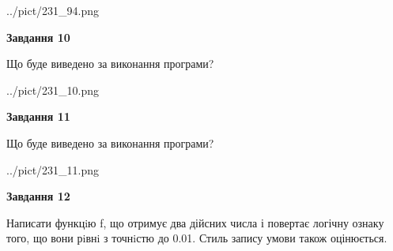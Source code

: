 \documentclass[12pt, ukrainian]{article}
\begin{document}
{\begin {large}
\begin{center}
	{../pict/231_94.png}
\end{center}
\newpage

{\begin {center}\textbf{Завдання 10}\end {center}}

Що буде виведено за виконання програми?\par
\begin{center}
	{../pict/231_10.png}
\end{center}
\newpage

{\begin {center}\textbf{Завдання 11}\end {center}}

Що буде виведено за виконання програми?\par
\begin{center}
	{../pict/231_11.png}
\end{center}
\newpage

{\begin {center}\textbf{Завдання 12}\end {center}}


Написати функцiю f, що отримує два дійсних числа і повертає логічну ознаку того, що вони рiвнi з точнiстю до 0.01. Стиль запису умови також оцінюється.\par
\newpage

\end {large}}
\end{document}
